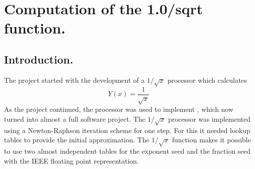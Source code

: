 %
% 
% 
% 
% 
% 
% 
% 
% 
%

\section{Computation of the 1.0/sqrt function.}
\label{sec:sqrt}
\subsection{Introduction.}
The {\gromacs} project started with the development of a $1/\sqrt{x}$
processor which calculates
\begin{equation}
Y(x) = \frac{1}{ \sqrt{x} }
\end{equation}
As the project continued, the {\intel} processor was used to implement
{\gromacs}, which now turned into almost a full software project.  The
$1/\sqrt{x}$ processor was implemented using a Newton-Raphson
iteration scheme for one step. For this it needed lookup tables to
provide the initial approximation. The $1/\sqrt{x}$ function makes it
possible to use two almost independent tables for the exponent seed
and the fraction seed with the IEEE floating point representation.

